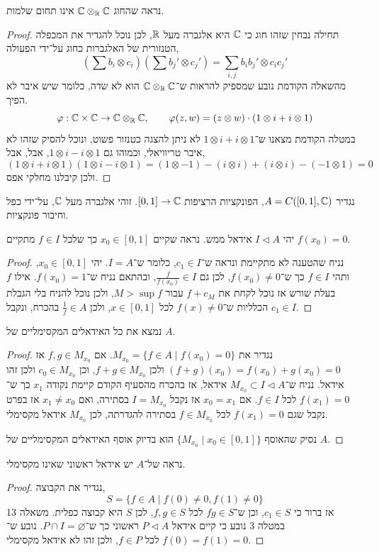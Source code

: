 \question{}
נראה שהחוג $\mathbb{C} \otimes_{\mathbb{R}} \mathbb{C}$ אינו תחום שלמות.
\begin{proof}
	תחילה נבחין שזהו חוג כי $\mathbb{C}$ היא אלגברה מעל $\mathbb{R}$, לכן נוכל להגדיר את המכפלה הטנזורית של האלגברות כחוג על־ידי הפעולה,
	\[
		\left(\sum b_i \otimes c_i\right)\left(\sum b_j' \otimes c_j'\right)
		= \sum_{i, j} b_i b_j' \otimes c_i c_j'
	\]
	מהשאלה הקודמת נובע שמספיק להראות ש־$\mathbb{C} \otimes_{\mathbb{R}} \mathbb{C}$ הוא לא שדה, כלומר שיש איבר לא הפיך.
	\[
		\varphi : \mathbb{C} \times \mathbb{C} \to \mathbb{C} \otimes_{\mathbb{R}} \mathbb{C},
		\qquad
		\varphi(z, w)
		= (z \otimes w) \cdot (1 \otimes i + i \otimes 1)
	\]
	במטלה הקודמת מצאנו ש־$1 \otimes i + i \otimes 1$ לא ניתן להצגה כטנזור פשוט, ונוכל להסיק שזהו לא איבר טריוויאלי, וכמוהו גם $1 \otimes i - i \otimes 1$, אבל,
	אבל,
	\[
		(1 \otimes i + i \otimes 1)(1 \otimes i - i \otimes 1)
		= (1 \otimes -1) - (i \otimes i) + (i \otimes i) - (-1 \otimes 1)
		= 0
	\]
	ולכן קיבלנו מחלקי אפס.
\end{proof}

\question[11]{}
נגדיר $A = C([0, 1], \mathbb{C})$, הפונקציות הרציפות $[0, 1] \to \mathbb{C}$.
זוהי אלגברה מעל $\mathbb{C}$, על־ידי כפל וחיבור פונקציות.

\subquestion{}
יהי $I \triangleleft A$ אידאל ממש.
נראה שקיים $x_0 \in [0, 1]$ כך שלכל $f \in I$ מתקיים $f(x_0) = 0$.
\begin{proof}
	נניח שהטענה לא מתקיימת ונראה ש־$c_1 \in I$, כלומר ש־$I = A$.
	יהי $x_0 \in [0, 1]$, ותהי $f \in I$ כך ש־$f(x_0) \ne 0$, לכן גם $\frac{f}{f(x_0)} \in I$, ובהתאם נניח ש־$f(x_0) = 1$.
	אילו $f$ בעלת שורש אז נוכל לקחת את $f + c_M$ עבור $M > \sup f$, ולכן נוכל להניח בלי הגבלת הכלליות ש־$f(x) \ne 0$ לכל $x \in [0, 1]$, ולכן $\frac{1}{f} \in A$ בהכרח, ונקבל $c_1 \in I$.
\end{proof}

\subquestion{}
נמצא את כל האידאלים המקסימליים של $A$.
\begin{proof}
	נגדיר את $M_{x_0} = \{ f \in A \mid f(x_0) = 0 \}$.
	אם $f, g \in M_{x_0}$ אז $(f + g)(x_0) = f(x_0) + g(x_0) = 0$ ולכן $f + g \in M_{x_0}$, וכן $c_0 \in M_{x_0}$ ולכן זהו אידאל.
	נניח ש־$M_{x_0} \subset I \triangleleft A$ אידאל, אז בהכרח מהסעיף הקודם קיימת נקודה $x_1$ כך ש־$f(x_1) = 0$ לכל $f \in I$.
	אם $x_0 = x_1$ אז נקבל $I = M_{x_0}$ בסתירה, ואם $x_1 \ne x_0$ אז בפרט נקבל שגם $f(x_1) = 0$ לכל $f \in M_{x_0}$ בסתירה להגדרתה, לכן $M_{x_0}$ אידאל מקסימלי.

	נסיק שהאוסף $\{ M_{x_0} \mid x_0 \in [0, 1] \}$ הוא בדיוק אוסף האידאלים המקסימליים של $A$.
\end{proof}

\subquestion{}
נראה של־$A$ יש אידאל ראשוני שאינו מקסימלי.
\begin{proof}
	נגדיר את הקבוצה,
	\[
		S = \{ f \in A \mid f(0) \ne 0, f(1) \ne 0 \}
	\]
	אז ברור כי $c_1 \in S$, וכן ש־$f g \in S$ לכל $f, g \in S$, לכן $S$ היא קבוצה כפלית.
	משאלה 13 במטלה 3 נובע כי קיים אידאל $P \triangleleft A$ ראשוני כך ש־$P \cap I = \varnothing$.
	נובע ש־$f(0) = f(1) = 0$ לכל $f \in P$, ולכן זהו לא אידאל מקסימלי.
\end{proof}


